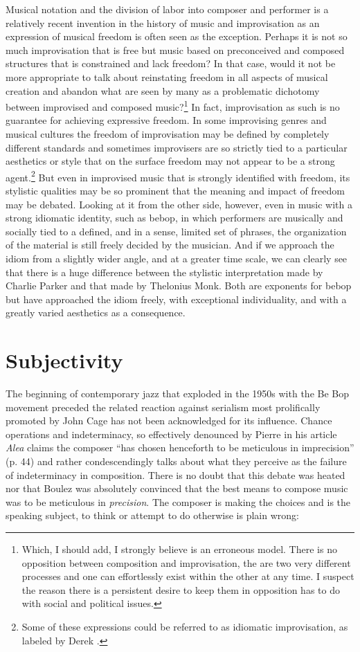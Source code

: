 \documentclass[a4paper]{article}
\begin{document}
Musical notation and the division of labor into composer and performer is a relatively recent invention in the history of music and improvisation as an expression of musical freedom is often seen as the exception. Perhaps it is not so much improvisation that is free but music based on preconceived and composed structures that is constrained and lack freedom? In that case, would it not be more appropriate to talk about reinstating freedom in all aspects of musical creation and abandon what are seen by many as a problematic dichotomy between improvised and composed music?\footnote{Which, I should add, I strongly believe is an erroneous model. There is no opposition between composition and improvisation, the are two very different processes and one can effortlessly exist within the other at any time. I suspect the reason there is a persistent desire to keep them in opposition has to do with social and political issues.} In fact, improvisation as such is no guarantee for achieving expressive freedom. In some improvising genres and musical cultures the freedom of improvisation may be defined by completely different standards and sometimes improvisers are so strictly tied to a particular aesthetics or style that on the surface freedom may not appear to be a strong agent.\footnote{Some of these expressions could be referred to as idiomatic improvisation, as labeled by Derek \citet{bailey92}.} But even in improvised music that is strongly identified with freedom, its stylistic qualities may be so prominent that the meaning and impact of freedom may be debated. Looking at it from the other side, however, even in music with a strong idiomatic identity, such as bebop, in which performers are musically and socially tied to a defined, and in a sense, limited set of phrases, the organization of the material is still freely decided by the musician. And if we approach the idiom from a slightly wider angle, and at a greater time scale, we can clearly see that there is a huge difference between the stylistic interpretation made by Charlie Parker and that made by Thelonius Monk. Both are exponents for bebop but have approached the idiom freely, with exceptional individuality, and with a greatly varied aesthetics as a consequence.

\section*{Subjectivity}
\label{sec:habit-self}

The beginning of contemporary jazz that exploded in the 1950s with the Be Bop movement preceded the related reaction against serialism most prolifically promoted by John Cage has not been acknowledged for its influence. Chance operations and indeterminacy, so effectively denounced by Pierre \citet{boulez64} in his article \emph{Alea} claims the composer ``has chosen henceforth to be meticulous in imprecision'' (p. 44) and rather condescendingly talks about what they perceive as the failure of indeterminacy in composition. There is no doubt that this debate was heated nor that Boulez was absolutely convinced that the best means to compose music was to be meticulous in \emph{precision}. The composer is making the choices and is the speaking subject, to think or attempt to do otherwise is plain wrong:
\end{document}
